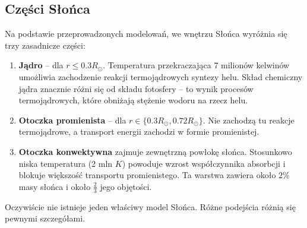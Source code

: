 \documentclass[../index.tex]{subfiles}
\begin{document}
        \subsection{Części Słońca}
            Na podstawie przeprowadzonych modelowań, we wnętrzu Słońca wyróżnia się trzy zasadnicze części:
            \begin{enumerate}
                \item \textbf{Jądro} – dla \(r \leq 0.3 R_\odot\). Temperatura przekraczająca 7 milionów kelwinów umożliwia zachodzenie reakcji termojądrowych syntezy helu. Skład chemiczny jądra znacznie różni się od składu fotosfery – to wynik procesów termojądrowych, które obniżają stężenie wodoru na rzecz helu.
                \item \textbf{Otoczka promienista} – dla \(r\in\{0.3 R_\odot, 0.72 R_\odot\}\). Nie zachodzą tu reakcje termojądrowe, a transport energii zachodzi w formie promienistej.
                \item \textbf{Otoczka konwektywna} zajmuje zewnętrzną powłokę słońca. Stosunkowo niska temperatura (2 mln \(K\)) powoduje wzrost współczynnika absorbcji i blokuje większość transportu promienistego. Ta warstwa zawiera około \(2\%\) masy słońca i około \(\frac{2}{3}\) jego objętości.
            \end{enumerate} 
            Oczywiście nie istnieje jeden właściwy model Słońca. Różne podejścia różnią się pewnymi szczegółami.
\end{document}
